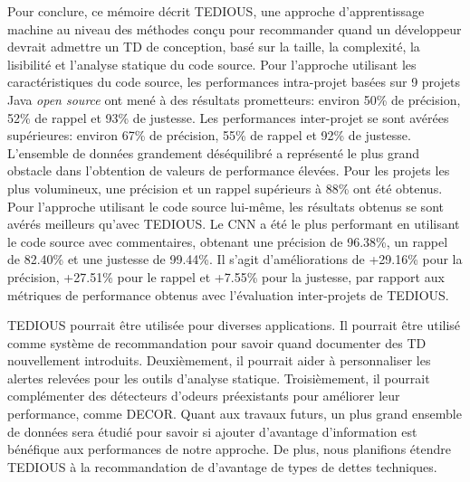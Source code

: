 Pour conclure, ce m\'{e}moire d\'{e}crit \ac{TEDIOUS}, une approche d'apprentissage machine au niveau des m\'{e}thodes con\c{c}u pour recommander quand un d\'{e}veloppeur devrait admettre un \ac{TD} de conception, bas\'{e} sur la taille, la complexit\'{e}, la lisibilit\'{e} et l'analyse statique du code source. Pour l'approche utilisant les caract\'{e}ristiques du code source, les performances intra-projet bas\'{e}es sur 9 projets Java \emph{open source} ont men\'{e} \`{a} des r\'{e}sultats prometteurs: environ 50\% de pr\'{e}cision, 52\% de rappel et 93\% de justesse. Les performances inter-projet se sont av\'{e}r\'{e}es sup\'{e}rieures: environ 67\% de pr\'{e}cision, 55\% de rappel et 92\% de justesse. L'ensemble de donn\'{e}es grandement d\'{e}s\'{e}quilibr\'{e} a repr\'{e}sent\'{e} le plus grand obstacle dans l'obtention de valeurs de performance \'{e}lev\'{e}es. Pour les projets les plus volumineux, une pr\'{e}cision et un rappel sup\'{e}rieurs \`{a} 88\% ont \'{e}t\'{e} obtenus. Pour l'approche utilisant le code source lui-m\^{e}me, les r\'{e}sultats obtenus se sont av\'{e}r\'{e}s meilleurs qu'avec TEDIOUS. Le CNN a \'{e}t\'{e} le plus performant en utilisant le code source avec commentaires, obtenant une pr\'{e}cision de 96.38\%, un rappel de 82.40\% et une justesse de 99.44\%. Il s'agit d'am\'{e}liorations de +29.16\% pour la pr\'{e}cision, +27.51\% pour le rappel et +7.55\% pour la justesse, par rapport aux m\'{e}triques de performance obtenus avec l'\'{e}valuation inter-projets de TEDIOUS.

\ac{TEDIOUS} pourrait \^{e}tre utilis\'{e}e pour diverses applications. Il pourrait \^{e}tre utilis\'{e} comme syst\`{e}me de recommandation pour savoir quand documenter des \ac{TD} nouvellement introduits. Deuxi\`{e}mement, il pourrait aider \`{a} personnaliser les alertes relev\'{e}es pour les outils d'analyse statique. Troisi\`{e}mement, il pourrait compl\'{e}menter des d\'{e}tecteurs d'odeurs pr\'{e}existants pour am\'{e}liorer leur performance, comme \ac{DECOR}. Quant aux travaux futurs, un plus grand ensemble de donn\'{e}es sera \'{e}tudi\'{e} pour savoir si ajouter d'avantage d'information est b\'{e}n\'{e}fique aux performances de notre approche. De plus, nous planifions \'{e}tendre \ac{TEDIOUS} \`{a} la recommandation de d'avantage de types de dettes techniques.























